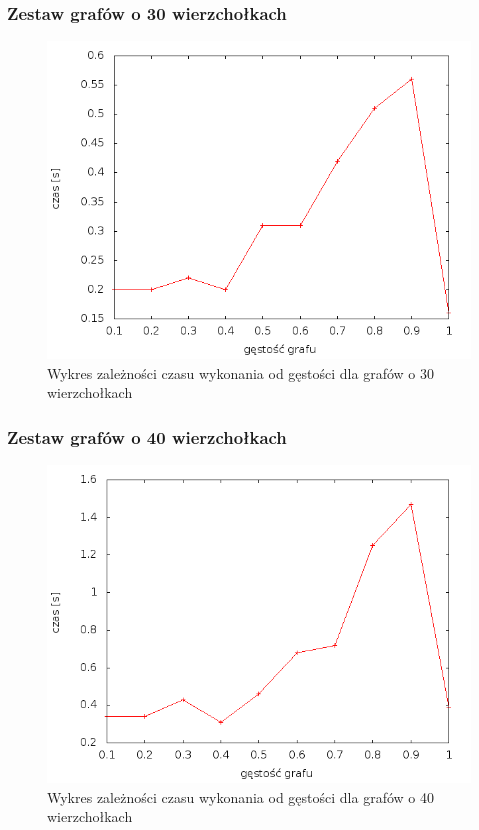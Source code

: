 \documentclass[12pt, a4paper]{article}
\begin{document}
\subsubsection*{Zestaw grafów o 30 wierzchołkach}
\begin{figure}[!h]
    \begin{center}
	\includegraphics[scale=0.5]{../experiment_1/img/dim/dim_30.png}
	\caption{Wykres zależności czasu wykonania od gęstości dla grafów o 30 wierzchołkach}
    \end{center}
\end{figure}
\FloatBarrier
\subsubsection*{Zestaw grafów o 40 wierzchołkach}
\begin{figure}[!h]
    \begin{center}
	\includegraphics[scale=0.5]{../experiment_1/img/dim/dim_40.png}
	\caption{Wykres zależności czasu wykonania od gęstości dla grafów o 40 wierzchołkach}
    \end{center}
\end{figure}
\FloatBarrier
\newpage
\end{document}
